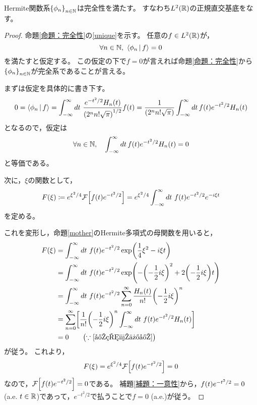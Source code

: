 \documentclass[a4paper,draft]{ltjsarticle}
\begin{document}
\begin{thm}[Hermite関数系の完全性]
    Hermite関数系$\seq{\phi_n}{n\in\N}$は完全性を満たす。
    すなわち$\fun{L^2}{\R}$の正規直交基底をなす。

    \begin{proof}
        命題\ref{命題：完全性}の\ref{unique}を示す。
        任意の$f\in\fun{L^2}{\R}$が，
        \begin{equation}
            \forall n\in\N,\ \inner{\phi_n}{f}=0
        \end{equation}
        を満たすと仮定する。
        この仮定の下で$f=0$が言えれば命題\ref{命題：完全性}から$\seq{\phi_n}{n\in\N}$が完全系であることが言える。

        まずは仮定を具体的に書き下す。
        \begin{equation}
            0
            =\inner{\phi_n}{f}
            =\int_{-\infty}^\infty dt\ \dfrac{e^{-t^2/2}\fun{H_n}{t}}{\pare{2^n n! \sqrt{\pi}}^{1/2}}\fun{f}{t}
            =\dfrac{1}{\pare{2^n n! \sqrt{\pi}}}\int_{-\infty}^\infty dt\, \fun{f}{t} e^{-t^2/2} \fun{H_n}{t}
        \end{equation}
        となるので，仮定は
        \begin{equation}
            \forall n\in\N,\quad \int_{-\infty}^\infty dt\, \fun{f}{t} e^{-t^2/2} \fun{H_n}{t}=0
            \label{定理：仮定}
        \end{equation}
        と等価である。

        次に，$\xi$の関数として，
        \begin{equation}
            \fun{F}{\xi}\coloneqq e^{\xi^2/4}\Fourier{\fun{f}{t}e^{-t^2/2}}=e^{\xi^2/4}\int_{-\infty}^\infty dt\ \fun{f}{t}e^{-t^2/2}e^{-i\xi t}
        \end{equation}
        を定める。
        
        これを変形し，命題\ref{mother}のHermite多項式の母関数を用いると，
        \begin{align}
            \fun{F}{\xi}
            &=\int_{-\infty}^\infty dt\ \fun{f}{t}e^{-t^2/2}\fun{\exp}{\dfrac{1}{4}\xi^2-i\xi t}
            \\
            &=\int_{-\infty}^\infty dt\ \fun{f}{t}e^{-t^2/2}\fun{\exp}{-\pare{-\dfrac{1}{2}i\xi}^2+2\pare{-\dfrac{1}{2}i\xi}t}
            \\
            &=\int_{-\infty}^\infty dt\ \fun{f}{t}e^{-t^2/2}
            \sum_{n=0}^\infty \dfrac{\fun{H_n}{t}}{n!}\pare{-\dfrac{1}{2}i\xi}^n
            \\
            &=\sum_{n=0}^\infty \squ{\dfrac{1}{n!}\pare{-\dfrac{1}{2}i\xi}^n\int_{-\infty}^\infty dt\ \fun{f}{t}e^{-t^2/2}\fun{H_n}{t}}
            \\
            &=0\quad \quad \pare{\because\eqref{定理：仮定}}
        \end{align}
        が従う。
        これより，
        \begin{equation}
            \fun{F}{\xi}=e^{\xi^2/4}\Fourier{\fun{f}{t}e^{-t^2/2}}=0
        \end{equation}
        なので，$\Fourier{\fun{f}{t}e^{-t^2/2}}=0$である。
        補題\ref{補題：一意性}から，$\fun{f}{t}e^{-t^2/2}=0$ (a.e. $t\in\mathbb{R}$)であって，$e^{-t^2/2}$で払うことで$f=0$ (a.e.)が従う。


\end{proof}
\end{thm}
\end{document}
